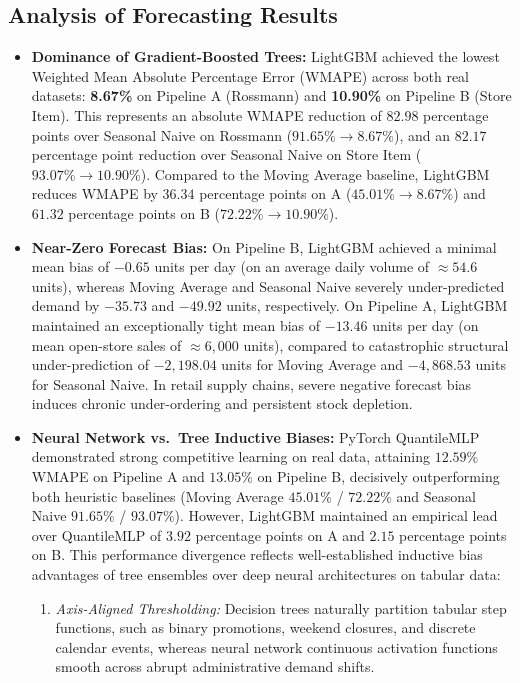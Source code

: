 \documentclass[11pt,a4paper]{article}
\begin{document}




\subsection{Analysis of Forecasting Results}
\begin{itemize}
    \item \textbf{Dominance of Gradient-Boosted Trees:} LightGBM achieved the lowest Weighted Mean Absolute Percentage Error (WMAPE) across both real datasets: \textbf{8.67\%} on Pipeline A (Rossmann) and \textbf{10.90\%} on Pipeline B (Store Item). This represents an absolute WMAPE reduction of $82.98$ percentage points over Seasonal Naive on Rossmann ($91.65\% \to 8.67\%$), and an $82.17$ percentage point reduction over Seasonal Naive on Store Item ($93.07\% \to 10.90\%$). Compared to the Moving Average baseline, LightGBM reduces WMAPE by $36.34$ percentage points on A ($45.01\% \to 8.67\%$) and $61.32$ percentage points on B ($72.22\% \to 10.90\%$).
    \item \textbf{Near-Zero Forecast Bias:} On Pipeline B, LightGBM achieved a minimal mean bias of $-0.65$ units per day (on an average daily volume of $\approx 54.6$ units), whereas Moving Average and Seasonal Naive severely under-predicted demand by $-35.73$ and $-49.92$ units, respectively. On Pipeline A, LightGBM maintained an exceptionally tight mean bias of $-13.46$ units per day (on mean open-store sales of $\approx 6,000$ units), compared to catastrophic structural under-prediction of $-2,198.04$ units for Moving Average and $-4,868.53$ units for Seasonal Naive. In retail supply chains, severe negative forecast bias induces chronic under-ordering and persistent stock depletion.
    \item \textbf{Neural Network vs.\ Tree Inductive Biases:} PyTorch QuantileMLP demonstrated strong competitive learning on real data, attaining $12.59\%$ WMAPE on Pipeline A and $13.05\%$ on Pipeline B, decisively outperforming both heuristic baselines (Moving Average $45.01\%$ / $72.22\%$ and Seasonal Naive $91.65\%$ / $93.07\%$). However, LightGBM maintained an empirical lead over QuantileMLP of $3.92$ percentage points on A and $2.15$ percentage points on B. This performance divergence reflects well-established inductive bias advantages of tree ensembles over deep neural architectures on tabular data:
    \begin{enumerate}
        \item \emph{Axis-Aligned Thresholding:} Decision trees naturally partition tabular step functions, such as binary promotions, weekend closures, and discrete calendar events, whereas neural network continuous activation functions smooth across abrupt administrative demand shifts.

\end{enumerate}
\end{itemize}
\end{document}
